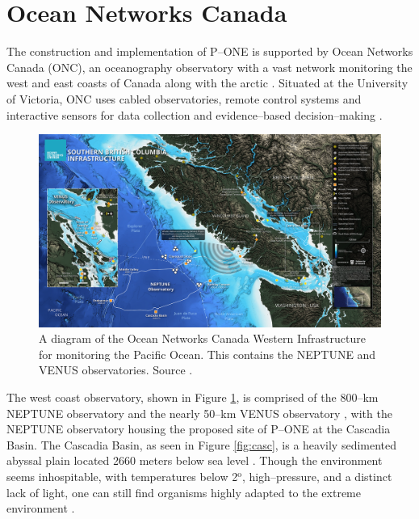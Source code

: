 \section{Ocean Networks Canada}

The construction and implementation of P--ONE is supported by Ocean Networks Canada (ONC), an oceanography observatory with a vast network monitoring the west and east coasts of Canada along with the arctic \cite{onc}. Situated at the University of Victoria, ONC uses cabled observatories, remote control systems and interactive sensors for data collection and evidence--based decision--making \cite{onc}. 

\begin{figure}[h]
  \centering
  \includegraphics[width=.9\textwidth]{./Figures/western_infrastructure.png}
  \caption{A diagram of the Ocean Networks Canada Western Infrastructure for monitoring the Pacific Ocean. This contains the NEPTUNE and VENUS observatories. Source \cite{onc}.}
  \label{fig:west_inf}
\end{figure}

The west coast observatory, shown in Figure \ref{fig:west_inf}, is comprised of the 800--km NEPTUNE observatory and the nearly 50--km VENUS observatory \cite{onc}, with the NEPTUNE observatory housing the proposed site of P--ONE at the Cascadia Basin. The Cascadia Basin, as seen in Figure \ref{fig:casc}, is a heavily sedimented abyssal plain located 2660 meters below sea level \cite{onc}. Though the environment seems inhospitable, with temperatures below 2$^{\text{o}}$, high--pressure, and a distinct lack of light, one can still find organisms highly adapted to the extreme environment \cite{onc}. 

